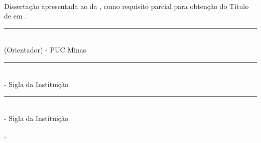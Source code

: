
\makeatletter	%

	\thispagestyle{empty}
	
	\begin{center}
		\por %
	\end{center}
	
	\vfill %
	
	\begin{center}
		\textbf{\monog}\\ %
		\textbf{\subtitulo} %
	\end{center}
	
	\vfill %
	
	\begin{flushright}
		\begin{minipage}{9cm}
			{Dissertação apresentada ao \curso \hspace{0.1cm} da \univ, \hspace{0.1cm} como \hspace{0.1cm} requisito parcial \hspace{0.1cm} para \hspace{0.1cm} obtenção \hspace{0.1cm} do \hspace{0.1cm} Título \hspace{0.1cm} de \hspace{0.1cm} \grau em \curso.} %
		\end{minipage}
	\end{flushright}
	
	\vfill %
	
	\begin{center}
		\rule{8cm}{0.01cm}\\ %
		\profOrientador (Orientador) - PUC Minas %
	\end{center}
	
	\vfill %
	
	\begin{center}
		\rule{8cm}{0.01cm}\\  %
		\profA - Sigla da Instituição %
	\end{center}
	
	\vfill %
	
	\begin{center}
		\rule{8cm}{0.01cm}\\ %
		\profB - Sigla da Instituição %
	\end{center}
	
	\vfill %
	
	\begin{center}
		\cidade, \dataCompleta %
	\end{center}
\makeatletter	%
	\newpage %
